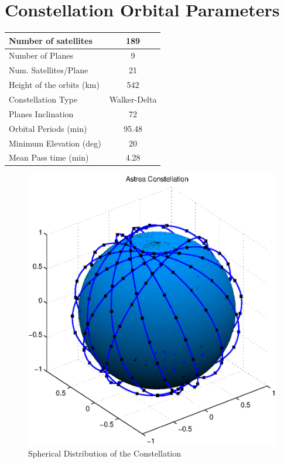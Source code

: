 \section{Constellation Orbital Parameters}

\begin{minipage}{0.5\textwidth}
\begin{tabular}{|l|c|}
	\hline
	Number of satellites & 189 \\ \hline
	Number of Planes & 9 \\ \hline
	Num. Satellites/Plane & 21 \\ \hline
	Height of the orbits (km) & 542 \\ \hline
	Constellation Type & Walker-Delta \\ \hline
	Planes Inclination & 72 \\ \hline
	Orbital Periods (min) & 95.48 \\ \hline
	Minimum Elevation (deg) & 20 \\ \hline
	Mean Pass time (min) & 4.28 \\ \hline
\end{tabular}
\end{minipage} \hfill
\begin{minipage}{0.45\textwidth}
\begin{figure}[H]
	\includegraphics[scale=0.6]{ConstellationSphere}
	\caption{Spherical Distribution of the Constellation}	
\end{figure}
\end{minipage}

